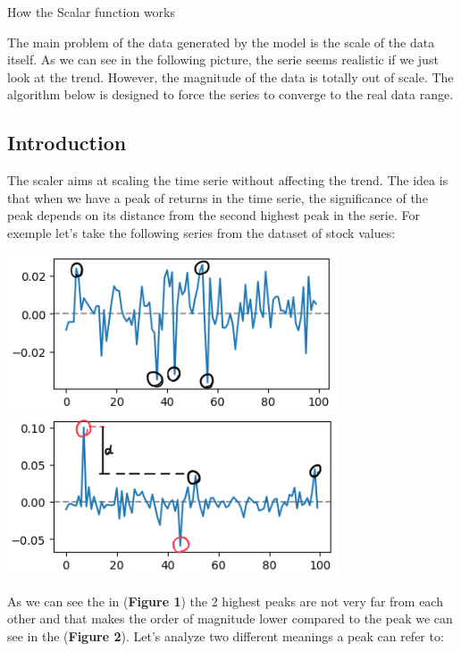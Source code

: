 \documentclass{article}
\begin{document}
\begin{center}
    {\huge{How the Scalar function works}}
\end{center}    
    \begin{multicols}{2}
    The main problem of the data generated by the model is the scale of the data itself.
    As we can see in the following picture, the serie seems realistic if we just look at the trend.
    However, the magnitude of the data is totally out of scale. The algorithm below is designed to force
    the series to converge to the real data range.
    \subsection*{Introduction}
    The scaler aims at scaling the time serie without affecting the trend. The idea is that when we have 
    a peak of returns in the time serie, the significance of the peak depends on its distance from the second highest peak in the serie. For exemple let's take the following series from the dataset of stock values:\\
    \begin{center}
        \includegraphics[scale = 0.7]{imgs/riccardo/small_peaks.png}
        \includegraphics[scale = 0.7]{imgs/riccardo/big_peaks.png}\\
    \end{center}
    As we can see the in (\textbf{Figure 1}) the 2 highest peaks are not very far from each other and that makes the order of magnitude lower compared to the peak we can see in the (\textbf{Figure 2}). Let's analyze two different meanings a peak can refer to:

\end{multicols}
\end{document}
